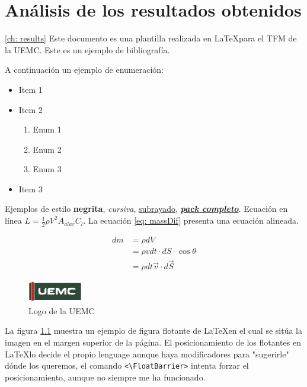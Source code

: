 \chapter{Análisis de los resultados obtenidos}\ref{ch: results}
Este documento es una plantilla realizada en \LaTeX para el \gls{TFM} de la \gls{UEMC}. Este es un ejemplo de bibliografía\cite{Finazzi}.

A continuación un ejemplo de enumeración:
\begin{itemize}
	\item Item 1
	\item Item 2
	\begin{enumerate}
		\item Enum 1
		\item Enum 2
		\item Enum 3
	\end{enumerate}
	\item Item 3
\end{itemize}

Ejemplos de estilo \textbf{negrita}, \textit{cursiva}, \underline{subrayado}, \textbf{\textit{\underline{pack completo}}}. Ecuación en línea $L=\frac{1}{2}\rho V^2 A_{alar}C_l$. La ecuación \ref{eq: massDif} presenta una ecuación alineada.

\begin{align}
	\nonumber
	dm &= \rho dV \\ \nonumber
	&= \rho v dt\cdot dS\cdot \cos{\theta}\\ \nonumber
	&= \rho dt \overrightarrow{v}\cdot d\overrightarrow{S}
\end{align}\label{eq: massDif}

\begin{figure}[ht!]
	\centering
	\includegraphics[width=\columnwidth]{Logo/uemc_logo.pdf}
	\caption{Logo de la \gls{UEMC}}
	\label{fig: UEMC_logo}
\end{figure}
La figura \ref{fig: UEMC_logo} muestra un ejemplo de figura flotante de \LaTeX en el cual se sitúa la imagen en el margen superior de la página. El posicionamiento de los flotantes en \LaTeX lo decide el propio lenguage aunque haya modificadores para "sugerirle" dónde los queremos, el comando \verb_<\FloatBarrier>_ intenta forzar el posicionamiento, aunque no siempre me ha funcionado.

